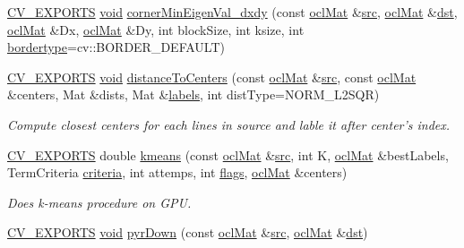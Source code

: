 \begin{DoxyCompactItemize}
\item 
\hyperlink{core_2types__c_8h_a1bf9f0e121b54272da02379cfccd0a2b}{C\-V\-\_\-\-E\-X\-P\-O\-R\-T\-S} \hyperlink{legacy_8hpp_a8bb47f092d473522721002c86c13b94e}{void} \hyperlink{namespacecv_1_1ocl_a5ac3ef8d16ac447ccc312387eeea8e5a}{corner\-Min\-Eigen\-Val\-\_\-dxdy} (const \hyperlink{classcv_1_1ocl_1_1oclMat}{ocl\-Mat} \&\hyperlink{legacy_8hpp_a371cd109b74033bc4366f584edd3dacc}{src}, \hyperlink{classcv_1_1ocl_1_1oclMat}{ocl\-Mat} \&\hyperlink{photo__c_8h_aed13e2a25279b24dc954073233fef7a5}{dst}, \hyperlink{classcv_1_1ocl_1_1oclMat}{ocl\-Mat} \&Dx, \hyperlink{classcv_1_1ocl_1_1oclMat}{ocl\-Mat} \&Dy, int block\-Size, int ksize, int \hyperlink{imgproc__c_8h_a217d51a46c1bcfec1157d02663e6e499}{bordertype}=cv\-::\-B\-O\-R\-D\-E\-R\-\_\-\-D\-E\-F\-A\-U\-L\-T)
\item 
\hyperlink{core_2types__c_8h_a1bf9f0e121b54272da02379cfccd0a2b}{C\-V\-\_\-\-E\-X\-P\-O\-R\-T\-S} \hyperlink{legacy_8hpp_a8bb47f092d473522721002c86c13b94e}{void} \hyperlink{namespacecv_1_1ocl_a99c6f8e997b47f5fb91571ad5415ef12}{distance\-To\-Centers} (const \hyperlink{classcv_1_1ocl_1_1oclMat}{ocl\-Mat} \&\hyperlink{legacy_8hpp_a371cd109b74033bc4366f584edd3dacc}{src}, const \hyperlink{classcv_1_1ocl_1_1oclMat}{ocl\-Mat} \&centers, Mat \&dists, Mat \&\hyperlink{core__c_8h_a1342f74a0f7dd7c20ab7e79b2e6e5af5}{labels}, int dist\-Type=N\-O\-R\-M\-\_\-\-L2\-S\-Q\-R)
\begin{DoxyCompactList}\small\item\em Compute closest centers for each lines in source and lable it after center's index. \end{DoxyCompactList}\item 
\hyperlink{core_2types__c_8h_a1bf9f0e121b54272da02379cfccd0a2b}{C\-V\-\_\-\-E\-X\-P\-O\-R\-T\-S} double \hyperlink{namespacecv_1_1ocl_a224f93ff761508287c4c19f580f13c8b}{kmeans} (const \hyperlink{classcv_1_1ocl_1_1oclMat}{ocl\-Mat} \&\hyperlink{legacy_8hpp_a371cd109b74033bc4366f584edd3dacc}{src}, int K, \hyperlink{classcv_1_1ocl_1_1oclMat}{ocl\-Mat} \&best\-Labels, Term\-Criteria \hyperlink{tracking_8hpp_ac10fcea99ab081e745366c6f5bbc8eb5}{criteria}, int attemps, int \hyperlink{highgui__c_8h_ae51e3a2d4365e85db9630dd3ce9508db}{flags}, \hyperlink{classcv_1_1ocl_1_1oclMat}{ocl\-Mat} \&centers)
\begin{DoxyCompactList}\small\item\em Does k-\/means procedure on G\-P\-U. \end{DoxyCompactList}\item 
\hyperlink{core_2types__c_8h_a1bf9f0e121b54272da02379cfccd0a2b}{C\-V\-\_\-\-E\-X\-P\-O\-R\-T\-S} \hyperlink{legacy_8hpp_a8bb47f092d473522721002c86c13b94e}{void} \hyperlink{namespacecv_1_1ocl_a36ac96c689c49f93d7f77cc3a7996c8e}{pyr\-Down} (const \hyperlink{classcv_1_1ocl_1_1oclMat}{ocl\-Mat} \&\hyperlink{legacy_8hpp_a371cd109b74033bc4366f584edd3dacc}{src}, \hyperlink{classcv_1_1ocl_1_1oclMat}{ocl\-Mat} \&\hyperlink{photo__c_8h_aed13e2a25279b24dc954073233fef7a5}{dst})

\end{DoxyCompactItemize}
